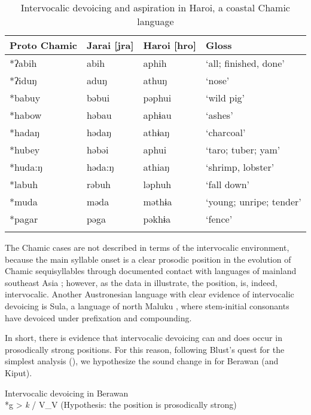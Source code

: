 \documentclass[output=paper]{langscibook}
\begin{document}
\begin{table}
\begin{tabularx}{\textwidth}{XXXl}
\lsptoprule
{Proto} {Chamic} & {Jarai} [jra] & {Haroi} [hro] & {Gloss}\\
\midrule
*ʔabih & abih & aphih     & `all; finished, done'\\
*ʔiduŋ & aduŋ & athuŋ     & `nose'\\
*babuy & bəbui & pəphui   & `wild pig'\\
*habow & həbau & aphɨau   & `ashes'\\
*hadaŋ & hədaŋ & athɨaŋ   & `charcoal'\\
*hubey & həbəi & aphui    & `taro; tuber; yam'\\
*huda:ŋ & həda:ŋ & athiaŋ & `shrimp, lobster'\\
*labuh & rəbuh & ləphuh   & `fall down'\\
*muda & məda & məthɨa     & `young; unripe; tender'\\
*pagar & pəga & pəkhɨa    & `fence'\\
\lspbottomrule
\end{tabularx}
\caption{\label{tab:blevins:7} Intervocalic devoicing and aspiration in Haroi, a coastal Chamic language  \citep[82]{Thurgood1999}}
\end{table}

The Chamic cases are not described in terms of the intervocalic environment, because the main syllable onset is a clear prosodic position in the evolution of Chamic sequisyllables through documented contact with languages of mainland southeast Asia \citep{Thurgood1999}; however, as the data in  illustrate, the position, is, indeed, intervocalic. Another Austronesian language with clear evidence of intervocalic devoicing is Sula, a language of north Maluku \citep{Bloyd2020}, where stem-initial consonants have devoiced under prefixation and compounding.

In short, there is evidence that intervocalic devoicing can and does occur in prosodically strong positions. For this reason, following Blust’s quest for the simplest analysis (\cite{chapters/03_Blust}), we hypothesize the sound change in  for Berawan (and Kiput).

\ea%
    \label{ex:blevins:8}
         Intervocalic devoicing in Berawan\\
*g  > \textit{k} / V\_V  \hspace{1em}  (Hypothesis: the position is prosodically strong)
    \z
\end{document}
